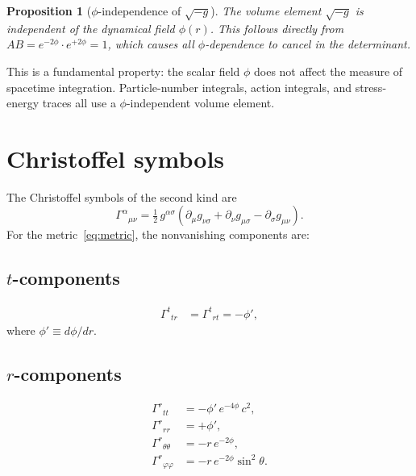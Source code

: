\documentclass[11pt,letterpaper]{article}
\newtheorem{proposition}[theorem]{Proposition}
\numberwithin{equation}{section}
\begin{document}
\begin{proposition}[$\phi$-independence of $\sqrt{-g}$]
The volume element $\sqrt{-g}$ is independent of the dynamical field $\phi(r)$.
This follows directly from $AB = e^{-2\phi}\cdot e^{+2\phi} = 1$, which causes
all $\phi$-dependence to cancel in the determinant.
\end{proposition}

This is a fundamental property: the scalar field $\phi$ does not affect the
measure of spacetime integration. Particle-number integrals, action integrals,
and stress-energy traces all use a $\phi$-independent volume element.

\section{Christoffel symbols}
\label{sec:christoffel}

The Christoffel symbols of the second kind are
\begin{equation}
  \Gamma^\alpha{}_{\mu\nu} = \tfrac{1}{2}\,g^{\alpha\sigma}\!\left(\partial_\mu g_{\nu\sigma} + \partial_\nu g_{\mu\sigma} - \partial_\sigma g_{\mu\nu}\right).
\end{equation}
For the metric~\eqref{eq:metric}, the nonvanishing components are:

\subsection{$t$-components}
\begin{align}
  \Gamma^t{}_{tr} &= \Gamma^t{}_{rt} = -\phi', \label{eq:gamma_ttr}
\end{align}
where $\phi' \equiv d\phi/dr$.

\subsection{$r$-components}
\begin{align}
  \Gamma^r{}_{tt} &= -\phi'\,e^{-4\phi}\,c^2, \label{eq:gamma_rtt}\\
  \Gamma^r{}_{rr} &= +\phi', \label{eq:gamma_rrr}\\
  \Gamma^r{}_{\theta\theta} &= -r\,e^{-2\phi}, \label{eq:gamma_rthth}\\
  \Gamma^r{}_{\varphi\varphi} &= -r\,e^{-2\phi}\sin^2\theta. \label{eq:gamma_rphph}
\end{align}
\end{document}

